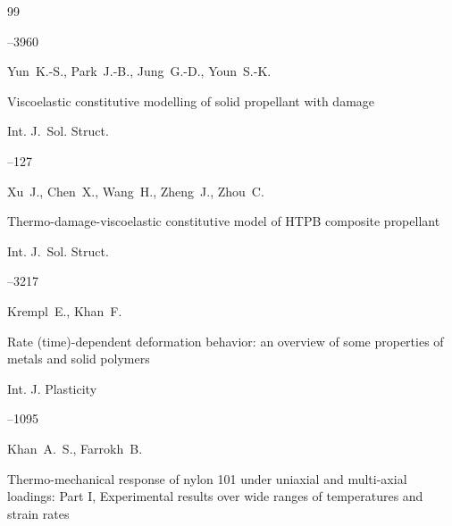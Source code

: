 \begin{thebibliography}{99}

--3960







\by Yun~K.-S., Park~J.-B., Jung~G.-D., Youn~S.-K.

\paper Viscoelastic constitutive modelling of solid propellant with damage 

\jour Int. J.~Sol. Struct.



--127







\by Xu~J., Chen~X., Wang~H., Zheng~J., Zhou~C.

\paper Thermo-damage-viscoelastic constitutive model of HTPB composite propellant 

\jour Int. J.~Sol. Struct.




--3217







\by Krempl~E., Khan~F.

\paper Rate (time)-dependent deformation behavior: an overview of some properties of metals and solid polymers 

\jour Int. J. Plasticity




--1095







\by Khan~A.~S., Farrokh~B.

\paper Thermo-mechanical response of nylon 101 under uniaxial and multi-axial loadings: Part I, Experimental results over wide ranges of temperatures and strain rates


\end{thebibliography}
